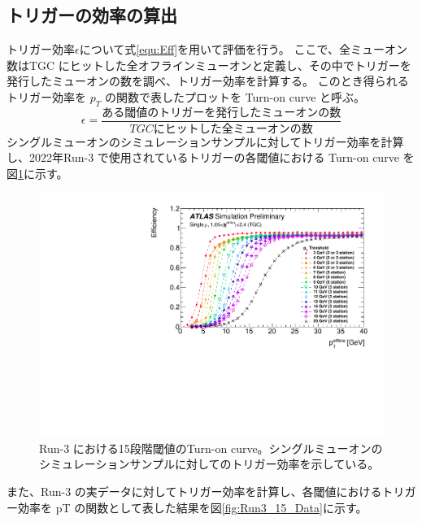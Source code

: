 \subsection{トリガーの効率の算出}
トリガー効率$\epsilon$について式\ref{equ:Eff}を用いて評価を行う。
ここで、全ミューオン数はTGC にヒットした全オフラインミューオンと定義し、その中でトリガーを発行したミューオンの数を調べ、トリガー効率を計算する。
このとき得られるトリガー効率を $p_T$ の関数で表したプロットを Turn-on curve と呼ぶ。
\begin{equation}
　\epsilon=\frac{ある閾値のトリガーを発行したミューオンの数}{TGCにヒットした全ミューオンの数}
　\label{equ:Eff}
\end{equation}
シングルミューオンのシミュレーションサンプルに対してトリガー効率を計算し、2022年Run-3 で使用されているトリガーの各閾値における Turn-on curve を図\ref{fig:Run3_15_MC}に示す。
\begin{figure}[tb]
  \centering
  \includegraphics[clip, width=15cm]{fig/3/PLOT-TRIG-2020-01-fig1.pdf}
  \caption{Run-3 における15段階閾値のTurn-on curve。シングルミューオンのシミュレーションサンプルに対してのトリガー効率を示している。}
  \label{fig:Run3_15_MC}
\end{figure}
また、Run-3 の実データに対してトリガー効率を計算し、各閾値におけるトリガー効率を pT の関数として表した結果を図\ref{fig:Run3_15_Data}に示す。

